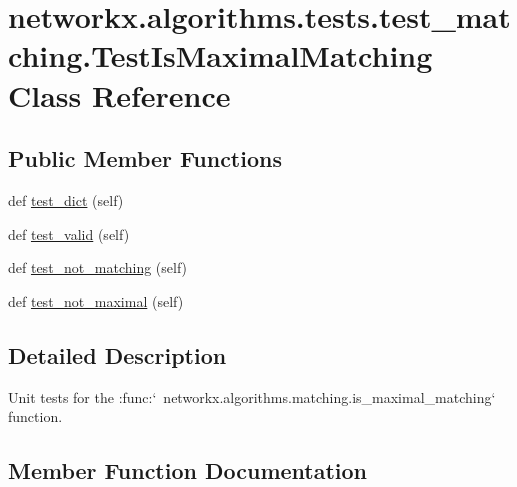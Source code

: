 \hypertarget{classnetworkx_1_1algorithms_1_1tests_1_1test__matching_1_1TestIsMaximalMatching}{}\section{networkx.\+algorithms.\+tests.\+test\+\_\+matching.\+Test\+Is\+Maximal\+Matching Class Reference}
\label{classnetworkx_1_1algorithms_1_1tests_1_1test__matching_1_1TestIsMaximalMatching}
\subsection*{Public Member Functions}
\begin{DoxyCompactItemize}
\item 
def \hyperlink{classnetworkx_1_1algorithms_1_1tests_1_1test__matching_1_1TestIsMaximalMatching_a9705ddcdd1097d625e7c63f1aa1a6934}{test\+\_\+dict} (self)
\item 
def \hyperlink{classnetworkx_1_1algorithms_1_1tests_1_1test__matching_1_1TestIsMaximalMatching_ad11e03db004ccfa45b15c9d6b3d40747}{test\+\_\+valid} (self)
\item 
def \hyperlink{classnetworkx_1_1algorithms_1_1tests_1_1test__matching_1_1TestIsMaximalMatching_af42693b49c264ee21a42a2cd43b2a11a}{test\+\_\+not\+\_\+matching} (self)
\item 
def \hyperlink{classnetworkx_1_1algorithms_1_1tests_1_1test__matching_1_1TestIsMaximalMatching_af10c808d58b89b089c9e856e90e93bbe}{test\+\_\+not\+\_\+maximal} (self)
\end{DoxyCompactItemize}


\subsection{Detailed Description}
\begin{DoxyVerb}Unit tests for the
:func:`~networkx.algorithms.matching.is_maximal_matching` function.\end{DoxyVerb}
 

\subsection{Member Function Documentation}
\mbox{\label{classnetworkx_1_1algorithms_1_1tests_1_1test__matching_1_1TestIsMaximalMatching_a9705ddcdd1097d625e7c63f1aa1a6934}} 
